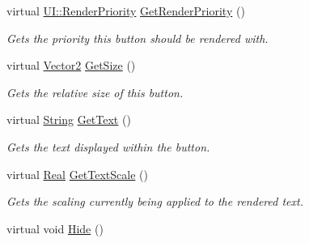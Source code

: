 \begin{DoxyCompactItemize}
virtual \hyperlink{namespaceMezzanine_1_1UI_ac4c753eb6b5d66350a243acc9ce54130}{UI::RenderPriority} \hyperlink{classMezzanine_1_1UI_1_1TextButton_a0253c0ad5729c0a62a8b83c4512ece99}{GetRenderPriority} ()
\begin{DoxyCompactList}\small\item\em Gets the priority this button should be rendered with. \item\end{DoxyCompactList}\item 
virtual \hyperlink{classMezzanine_1_1Vector2}{Vector2} \hyperlink{classMezzanine_1_1UI_1_1TextButton_aa09e523dd72046551be9837f11886c60}{GetSize} ()
\begin{DoxyCompactList}\small\item\em Gets the relative size of this button. \item\end{DoxyCompactList}\item 
virtual \hyperlink{namespaceMezzanine_acf9fcc130e6ebf08e3d8491aebcf1c86}{String} \hyperlink{classMezzanine_1_1UI_1_1TextButton_abe0c6b3e64217fa05f38437f692d5e64}{GetText} ()
\begin{DoxyCompactList}\small\item\em Gets the text displayed within the button. \item\end{DoxyCompactList}\item 
virtual \hyperlink{namespaceMezzanine_a726731b1a7df72bf3583e4a97282c6f6}{Real} \hyperlink{classMezzanine_1_1UI_1_1TextButton_a77298d3cf8be433b010a000ae49961a2}{GetTextScale} ()
\begin{DoxyCompactList}\small\item\em Gets the scaling currently being applied to the rendered text. \item\end{DoxyCompactList}\item 
\hypertarget{classMezzanine_1_1UI_1_1TextButton_ab406636b7f397fd5513cbb59a73c1928}{
virtual void \hyperlink{classMezzanine_1_1UI_1_1TextButton_ab406636b7f397fd5513cbb59a73c1928}{Hide} ()}
\label{classMezzanine_1_1UI_1_1TextButton_ab406636b7f397fd5513cbb59a73c1928}


\end{DoxyCompactItemize}
